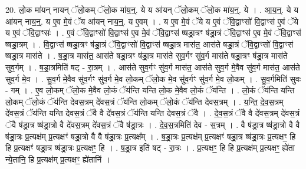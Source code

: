 \documentclass[17pt]{extarticle}
\begin{document}
20. लो॒क मा॑यन् नायन् ॅलो॒कम् ॅलो॒क मा॑य॒न्॒. ये य आ॑यन् ॅलो॒कम् ॅलो॒क मा॑य॒न्॒. ये । . आ॒य॒न्॒. ये य आ॑यन् नाय॒न्॒. य ए॒व मे॒वं ॅय आ॑यन् नाय॒न्॒. य ए॒वम् । . य ए॒व मे॒वं ॅये य ए॒वं ॅवि॒द्वाꣳसो॑ वि॒द्वाꣳस॑ ए॒वं ॅये य ए॒वं ॅवि॒द्वाꣳसः॑ । . ए॒वं ॅवि॒द्वाꣳसो॑ वि॒द्वाꣳस॑ ए॒व मे॒वं ॅवि॒द्वाꣳस॑ ष्षड्रा॒त्रꣳ ष॑ड्रा॒त्रं ॅवि॒द्वाꣳस॑ ए॒व मे॒वं ॅवि॒द्वाꣳस॑ ष्षड्रा॒त्रम् । . वि॒द्वाꣳस॑ ष्षड्रा॒त्रꣳ ष॑ड्रा॒त्रं ॅवि॒द्वाꣳसो॑ वि॒द्वाꣳस॑ ष्षड्रा॒त्र मास॑त॒ आस॑ते षड्रा॒त्रं ॅवि॒द्वाꣳसो॑ वि॒द्वाꣳस॑ ष्षड्रा॒त्र मास॑ते । . ष॒ड्रा॒त्र मास॑त॒ आस॑ते षड्रा॒त्रꣳ ष॑ड्रा॒त्र मास॑ते सुव॒र्गꣳ सु॑व॒र्ग मास॑ते षड्रा॒त्रꣳ ष॑ड्रा॒त्र मास॑ते सुव॒र्गम् । . ष॒ड्रा॒त्रमिति॑ षट् - रा॒त्रम् । . आस॑ते सुव॒र्गꣳ सु॑व॒र्ग मास॑त॒ आस॑ते सुव॒र्ग मे॒वैव सु॑व॒र्ग मास॑त॒ आस॑ते सुव॒र्ग मे॒व । . सु॒व॒र्ग मे॒वैव सु॑व॒र्गꣳ सु॑व॒र्ग मे॒व लो॒कम् ॅलो॒क मे॒व सु॑व॒र्गꣳ सु॑व॒र्ग मे॒व लो॒कम् । . सु॒व॒र्गमिति॑ सुवः - गम् । . ए॒व लो॒कम् ॅलो॒क मे॒वैव लो॒कं ॅय॑न्ति यन्ति लो॒क मे॒वैव लो॒कं ॅय॑न्ति । . लो॒कं ॅय॑न्ति यन्ति लो॒कम् ॅलो॒कं ॅय॑न्ति देवस॒त्रम् दे॑वस॒त्रं ॅय॑न्ति लो॒कम् ॅलो॒कं ॅय॑न्ति देवस॒त्रम् । . य॒न्ति॒ दे॒व॒स॒त्रम् दे॑वस॒त्रं ॅय॑न्ति यन्ति देवस॒त्रं ॅवै वै दे॑वस॒त्रं ॅय॑न्ति यन्ति देवस॒त्रं ॅवै । . दे॒व॒स॒त्रं ॅवै वै दे॑वस॒त्रम् दे॑वस॒त्रं ॅवै ष॑ड्रा॒त्र ष्ष॑ड्रा॒त्रो वै दे॑वस॒त्रम् दे॑वस॒त्रं ॅवै ष॑ड्रा॒त्रः । . दे॒व॒स॒त्रमिति॑ देव - स॒त्रम् । . वै ष॑ड्रा॒त्र ष्ष॑ड्रा॒त्रो वै वै ष॑ड्रा॒त्रः प्र॒त्यक्ष॑म् प्र॒त्यक्षꣳ॑ षड्रा॒त्रो वै वै ष॑ड्रा॒त्रः प्र॒त्यक्ष᳚म् । . ष॒ड्रा॒त्रः प्र॒त्यक्ष॑म् प्र॒त्यक्षꣳ॑ षड्रा॒त्र ष्ष॑ड्रा॒त्रः प्र॒त्यक्षꣳ॒॒ हि हि प्र॒त्यक्षꣳ॑ षड्रा॒त्र ष्ष॑ड्रा॒त्रः प्र॒त्यक्षꣳ॒॒ हि । . ष॒ड्रा॒त्र इति॑ षट् - रा॒त्रः । . प्र॒त्यक्षꣳ॒॒ हि हि प्र॒त्यक्ष॑म् प्र॒त्यक्षꣳ॒॒ ह्ये॑ता न्ये॒तानि॒ हि प्र॒त्यक्ष॑म् प्र॒त्यक्षꣳ॒॒ ह्ये॑तानि॑ । \newline
\end{document}
